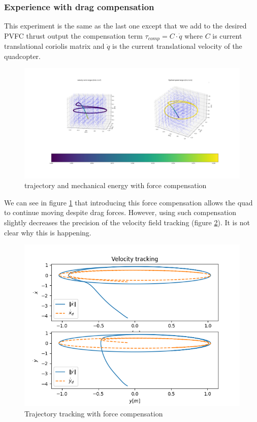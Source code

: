 \subsubsection{Experience with drag compensation}
This experiment is the same as the last one except that we add to the desired PVFC thrust output the compensation term $\tau_{comp} = C\cdot \dot{q}$ 
where $C$ is current translational coriolis matrix and $\dot{q}$ is the current translational velocity of the quadcopter.
\begin{figure}[h!]
   \centering
   \includegraphics[width=\linewidth]{Images/python-forcecomp.png}
   \caption{trajectory and mechanical energy with force compensation }
   \label{fig:pythoncomp}
\end{figure}
We can see in figure \ref{fig:pythoncomp} that introducing this force compensation allows the quad to continue moving despite drag forces. 
However, using such compensation slightly decreases the precision of the velocity field tracking (figure \ref{fig:trajtrackcomp}). It is not clear why this is happening.
\begin{figure}[h!]
   \centering
   \includegraphics[width=\linewidth]{Images/velocitytrackingpythoncomp.png}
   \caption{Trajectory tracking with force compensation }
   \label{fig:trajtrackcomp}
\end{figure}

